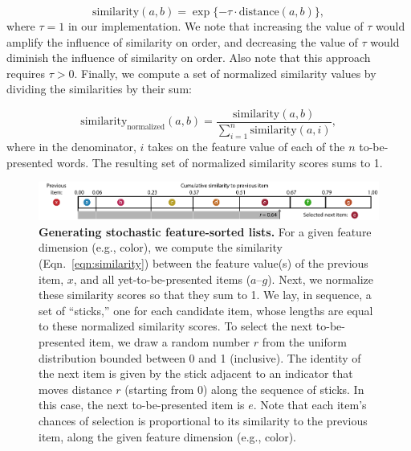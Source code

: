 \documentclass[11pt]{article}
\begin{document}
\begin{equation}
 \mathrm{similarity}(a, b) = \exp\{-\tau \cdot
\mathrm{distance}(a, b)\}, \label{eqn:similarity}
\end{equation}
where $\tau = 1$ in our implementation. We note that increasing the value of
$\tau$ would amplify the influence of similarity on order, and decreasing the
value of $\tau$ would diminish the influence of similarity on order. Also note
that this approach requires $\tau > 0$. Finally, we compute a set of
normalized similarity values by dividing the similarities by their sum:

\begin{equation}
\mathrm{similarity}_{\mathrm{normalized}}(a, b) = \frac{\mathrm{similarity}(a,
b)}{\sum_{i=1}^n \mathrm{similarity}(a, i)},
\end{equation}
where in the denominator, $i$ takes on the feature value of each of the $n$
to-be-presented words. The resulting set of normalized similarity scores sums
to 1.

\begin{figure}[tp]
    \centering
        \includegraphics[width=\textwidth]{figures/stick}

\caption{\textbf{Generating stochastic feature-sorted lists.} For a given
feature dimension (e.g., color), we compute the similarity
(Eqn.~\ref{eqn:similarity}) between the feature value(s) of the previous item,
$x$, and all yet-to-be-presented items ($a$--$g$). Next, we normalize these
similarity scores so that they sum to 1. We lay, in sequence, a set of
``sticks,'' one for each candidate item, whose lengths are equal to these
normalized similarity scores. To select the next to-be-presented item, we draw
a random number $r$ from the uniform distribution bounded between 0 and 1
(inclusive). The identity of the next item is given by the stick adjacent to an
indicator that moves distance $r$ (starting from 0) along the sequence of
sticks. In this case, the next to-be-presented item is $e$. Note that each
item's chances of selection is proportional to its similarity to the previous
item, along the given feature dimension (e.g., color).} \label{fig:stick}

\end{figure}
\end{document}
